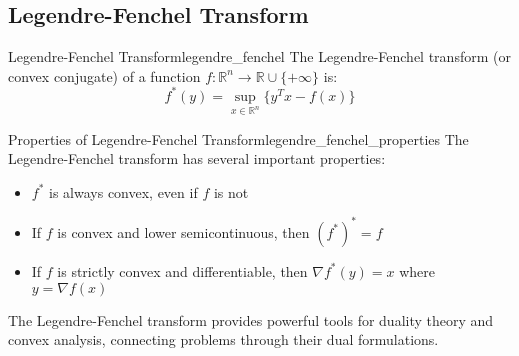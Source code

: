 \subsection{Legendre-Fenchel Transform}

\begin{definition}{Legendre-Fenchel Transform}{legendre_fenchel}
    The Legendre-Fenchel transform (or convex conjugate) of a function $f: \mathbb{R}^n \to \mathbb{R} \cup \{+\infty\}$ is:
    \[
    f^*(y) = \sup_{x \in \mathbb{R}^n} \{y^Tx - f(x)\}
    \]
\end{definition}

\begin{theorem}{Properties of Legendre-Fenchel Transform}{legendre_fenchel_properties}
    The Legendre-Fenchel transform has several important properties:
    \begin{itemize}
        \item $f^*$ is always convex, even if $f$ is not
        \item If $f$ is convex and lower semicontinuous, then $(f^*)^* = f$
        \item If $f$ is strictly convex and differentiable, then $\nabla f^*(y) = x$ where $y = \nabla f(x)$
    \end{itemize}
\end{theorem}

The Legendre-Fenchel transform provides powerful tools for duality theory and convex analysis, connecting problems through their dual formulations.
